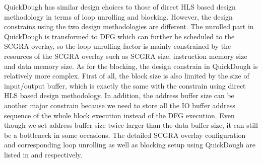 QuickDough has similar design choices to those of direct HLS based design methodology in terms of loop unrolling and blocking. However, the design constrains using the two design methodologies are different. The unrolled part in QuickDough is transformed to DFG which can further be scheduled to the SCGRA overlay, so the loop unrolling factor is mainly constrained by the resources of the SCGRA overlay such as SCGRA size, instruction memory size and data memory size. As for the blocking, the design constrain in QuickDough is relatively more complex. First of all, the block size is also limited by the size of input/output buffer, which is exactly the same with the constrain using direct HLS based design methodology. In addition, the address buffer size can be another major constrain because we need to store all the IO buffer address sequence of the whole block execution instead of the DFG execution. Even though we set address buffer size twice larger than the data buffer size, it can still be a bottleneck in some occasions. The detailed SCGRA overlay configuration and corresponding loop unrolling as well as blocking setup using QuickDough are listed in  and  respectively. 

\begin{table}[htpb]

\end{table}


